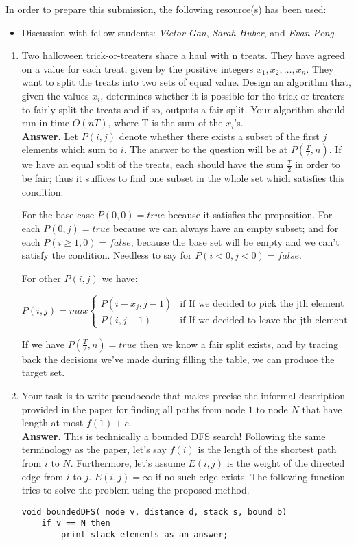 \documentclass[letterpaper,12pt]{article}
\newcommand{\twopartdef}[4]
{
	\left\{
		\begin{array}{ll}
			#1 & \mbox{if } #2 \\
			#3 & \mbox{if } #4
		\end{array}
	\right.
}
\begin{document}
\pagestyle{fancy}

In order to prepare this submission, the following resource(s) has been used:
\begin{itemize}
	\item Discussion with fellow students: \textit{Victor Gan}, \textit{Sarah Huber}, and \textit{Evan Peng}.
\end{itemize}

\begin{enumerate}

\item  Two halloween trick-or-treaters share a haul with n treats. They have agreed on a value for each treat, given by the positive integers $x_1, x_2, \ldots, x_n$. They want to split the treats into two sets of equal value. Design an algorithm that, given the values $x_i$, determines whether it is possible for the trick-or-treaters to fairly split the treats and if so, outputs a fair split. Your algorithm should run in time 
$O(nT)$, where T is the sum of the $x_i$'s.\\
\textbf{Answer.} Let $P(i, j)$ denote whether there exists a subset of the first $j$ elements which sum to $i$. The answer to the question will be at $P(\frac{T}{2}, n)$. If we have an equal split of the treats, each should have the sum $\frac{T}{2}$ in order to be fair; thus it suffices to find one subset in the whole set which satisfies this condition.

For the base case $P(0, 0)= true$ because it satisfies the proposition. For each $P(0, j) = true$ because we can always have an empty subset; and for each $P(i\geq1, 0) = false$, because the base set will be empty and we can't satisfy the condition. Needless to say for $P(i<0, j<0) = false$.

For other $P(i, j)$ we have:

\begin{equation*}
	P(i, j) = max \twopartdef
	{P(i-x_j, j-1)} 		{\text{If we decided to pick the jth element}}
	{P(i, j-1)}				{\text{If we decided to leave the jth element}}
\end{equation*}

If we have $P(\frac{T}{2}, n) = true$ then we know a fair split exists, and by tracing back the decisions we've made during filling the table, we can produce the target set.

\item Your task is to write pseudocode that makes precise the informal description provided in the paper for finding all paths from node $1$ to node $N$ that have length at most $f(1) + e$.\\
\textbf{Answer.} This is technically a bounded DFS search! Following the same terminology as the paper, let's say $f(i)$ is the length of the shortest path from $i$ to $N$. Furthermore, let's assume $E(i, j)$ is the weight of the directed edge from $i$ to $j$. $E(i, j)=\infty$ if no such edge exists. The following function tries to solve the problem using the proposed method.
\begin{verbatim}
void boundedDFS( node v, distance d, stack s, bound b)
    if v == N then
        print stack elements as an answer;
	

\end{verbatim}
\end{enumerate}
\end{document}
